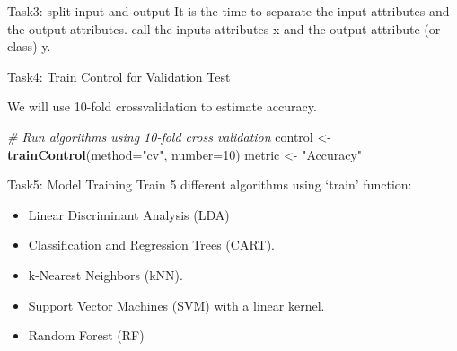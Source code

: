 \documentclass[
]{article}
\newenvironment{Shaded}{\begin{snugshade}}{\end{snugshade}}
\newcommand{\AttributeTok}[1]{\textcolor[rgb]{0.13,0.29,0.53}{#1}}
\newcommand{\CommentTok}[1]{\textcolor[rgb]{0.56,0.35,0.01}{\textit{#1}}}
\newcommand{\DecValTok}[1]{\textcolor[rgb]{0.00,0.00,0.81}{#1}}
\newcommand{\FunctionTok}[1]{\textcolor[rgb]{0.13,0.29,0.53}{\textbf{#1}}}
\newcommand{\NormalTok}[1]{#1}
\newcommand{\OtherTok}[1]{\textcolor[rgb]{0.56,0.35,0.01}{#1}}
\newcommand{\SpecialCharTok}[1]{\textcolor[rgb]{0.81,0.36,0.00}{\textbf{#1}}}
\newcommand{\StringTok}[1]{\textcolor[rgb]{0.31,0.60,0.02}{#1}}
\providecommand{\tightlist}{%
  \setlength{\itemsep}{0pt}\setlength{\parskip}{0pt}}
\begin{document}
Task3: split input and output It is the time to separate the input
attributes and the output attributes. call the inputs attributes x and
the output attribute (or class) y.

\begin{Shaded}
\end{Shaded}

Task4: Train Control for Validation Test

We will use 10-fold crossvalidation to estimate accuracy.

\begin{Shaded}
\begin{Highlighting}[]
\CommentTok{\# Run algorithms using 10{-}fold cross validation}
\NormalTok{control }\OtherTok{\textless{}{-}} \FunctionTok{trainControl}\NormalTok{(}\AttributeTok{method=}\StringTok{"cv"}\NormalTok{, }\AttributeTok{number=}\DecValTok{10}\NormalTok{)}
\NormalTok{metric }\OtherTok{\textless{}{-}} \StringTok{"Accuracy"}
\end{Highlighting}
\end{Shaded}

Task5: Model Training Train 5 different algorithms using `train'
function:

\begin{itemize}
\tightlist
\item
  Linear Discriminant Analysis (LDA)
\item
  Classification and Regression Trees (CART).
\item
  k-Nearest Neighbors (kNN).
\item
  Support Vector Machines (SVM) with a linear kernel.
\item
  Random Forest (RF)
\end{itemize}
\end{document}
